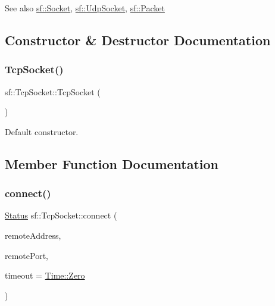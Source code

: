 \begin{DoxySeeAlso}{See also}
\mbox{\hyperlink{classsf_1_1_socket}{sf\+::\+Socket}}, \mbox{\hyperlink{classsf_1_1_udp_socket}{sf\+::\+Udp\+Socket}}, \mbox{\hyperlink{classsf_1_1_packet}{sf\+::\+Packet}} \begin{DoxyVerb}\end{DoxyVerb}
 
\end{DoxySeeAlso}


\subsection{Constructor \& Destructor Documentation}
\mbox{\label{classsf_1_1_tcp_socket_a62a9bf81fd7f15fedb29fd1348483236}} 
\subsubsection{\texorpdfstring{TcpSocket()}{TcpSocket()}}
{\footnotesize\ttfamily sf\+::\+Tcp\+Socket\+::\+Tcp\+Socket (\begin{DoxyParamCaption}{ }\end{DoxyParamCaption})}



Default constructor. 

\begin{DoxyVerb}\end{DoxyVerb}
 

\subsection{Member Function Documentation}
\mbox{\label{classsf_1_1_tcp_socket_a68cd42d5ab70ab54b16787f555951c40}} 
\subsubsection{\texorpdfstring{connect()}{connect()}}
{\footnotesize\ttfamily \mbox{\hyperlink{classsf_1_1_socket_a51bf0fd51057b98a10fbb866246176dc}{Status}} sf\+::\+Tcp\+Socket\+::connect (\begin{DoxyParamCaption}\item[{const \mbox{\hyperlink{classsf_1_1_ip_address}{Ip\+Address}} \&}]{remote\+Address,  }\item[{unsigned short}]{remote\+Port,  }\item[{\mbox{\hyperlink{classsf_1_1_time}{Time}}}]{timeout = {\ttfamily \mbox{\hyperlink{classsf_1_1_time_a8db127b632fa8da21550e7282af11fa0}{Time\+::\+Zero}}} }\end{DoxyParamCaption})}



